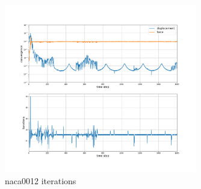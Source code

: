 \begin{figure}[htbp!]
	\centering
	\includegraphics[width=0.75\textwidth]{images/heathcote/naca0012_iterations.png}
	\caption{naca0012 iterations}
	\label{fig:hc-iterations}
\end{figure}


